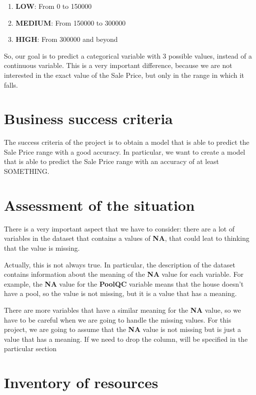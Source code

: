 \begin{enumerate}
    \item \textbf{LOW}: From 0 to 150000 
    \item \textbf{MEDIUM}: From 150000 to 300000 
    \item \textbf{HIGH}: From 300000 and beyond 
\end{enumerate}

So, our goal is to predict a categorical variable with 3 possible values, instead of a continuous variable. 
This is a very important difference, because we are not interested in the exact value of the Sale Price, but only in the range in which it falls.

\section{Business success criteria}
\label{subsec:business_success_criteria}
The success criteria of the project is to obtain a model that is able to predict the Sale Price range with a good accuracy. In particular, we want to create a model that is able to predict the Sale Price range with an accuracy of at least SOMETHING.

\section{Assessment of the situation}
\label{subsec:assessment_of_the_situation}

There is a very important aspect that we have to consider: there are a lot of variables in the dataset that contains a values of \textbf{NA}, that could leat to thinking that the value is missing.

Actually, this is not always true. In particular, the description of the dataset contains information about the meaning of the \textbf{NA} value for each variable. For example, the \textbf{NA} value for the \textbf{PoolQC} variable means that the house doesn't have a pool, so the value is not missing, but it is a value that has a meaning.

There are more variables that have a similar meaning for the \textbf{NA} value, so we have to be careful when we are going to handle the missing values. For this project, we are going to assume that the \textbf{NA} value is not missing but is just a value that has a meaning. If we need to drop the column, will be specified in the particular section

\section{Inventory of resources}
\label{subsec:inventory_of_resources}

